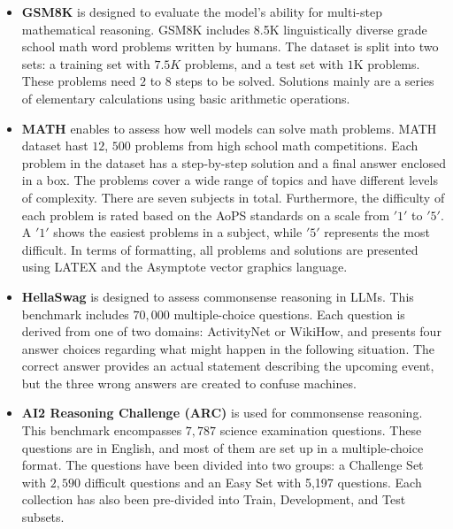 \documentclass[conference]{IEEEtran}
\begin{document}
\begin{itemize}
    \item \textbf{GSM8K} \cite{DBLP:journals/corr/abs-2110-14168}  is designed to evaluate the model's ability for multi-step mathematical reasoning. GSM8K includes 8.5K linguistically diverse grade school math word problems written by humans.  The dataset is split into two sets: a training set with $7.5K$ problems,  and a test set with $1$K problems. These problems need $2$ to $8$ steps to be solved.  Solutions mainly are a series of elementary calculations using basic arithmetic operations. 
    
    \item \textbf{MATH} \cite{DBLP:journals/corr/abs-2103-03874} enables to assess how well models can solve math problems. MATH dataset hast $12$, $500$ problems from high school math competitions. Each problem in the dataset has a step-by-step solution and a final answer enclosed in a box. The problems cover a wide range of topics and have different levels of complexity. There are seven subjects in total. Furthermore, the difficulty of each problem is rated based on the  AoPS standards on a scale from $'1'$ to $'5'$. A $'1'$ shows the easiest problems in a subject, while $'5'$ represents the most difficult.  In terms of formatting, all problems and solutions are presented using LATEX and the Asymptote vector graphics language.

    \item \textbf{HellaSwag} \cite{zellers2019hellaswag} is designed to assess commonsense reasoning in LLMs. This benchmark includes $70,000$ multiple-choice questions. Each question is derived from one of two domains: ActivityNet or WikiHow, and presents four answer choices regarding what might happen in the following situation. The correct answer provides an actual statement describing the upcoming event, but the three wrong answers are created to confuse machines. 
    
    \item \textbf{AI2 Reasoning Challenge (ARC)} \cite{DBLP:journals/corr/abs-1803-05457} is used for commonsense reasoning. This benchmark encompasses $7,787$ science examination questions. These questions are in English, and most of them are set up in a multiple-choice format. The questions have been divided into two groups: a Challenge Set with $2,590$ difficult questions and an Easy Set with 5,197 questions. Each collection has also been pre-divided into Train, Development, and Test subsets.
    

\end{itemize}
\end{document}
